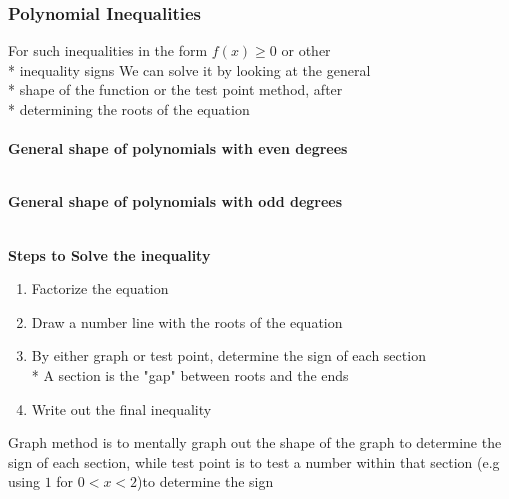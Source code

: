 \documentclass[../main.tex]{subfiles}
\begin{document}
\subsubsection{Polynomial Inequalities}
For such inequalities in the form \(f(x) \geq 0\) or other \\*
inequality signs We can solve it by looking at the general  \\*
shape of the function or the test point method, after  \\*
determining the roots of the equation \\\\
\textbf{General shape of polynomials with even degrees} \\
 \\
\textbf{General shape of polynomials with odd degrees} \\
 \\
\textbf{Steps to Solve the inequality}
\begin{enumerate}
    \item Factorize the equation
    \item Draw a number line with the roots of the equation
    \item By either graph or test point, determine the sign of each section\\* A section is the "gap" between roots and the ends
    \item Write out the final inequality
\end{enumerate}
Graph method is to mentally graph out the shape of the graph to
determine the sign of each section, while  test point is to test
a number within that section (e.g using \(1\) for \(0<x<2\))to
determine the sign
\end{document}
